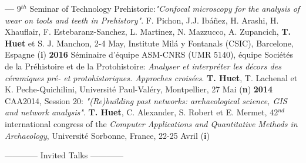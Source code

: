 \documentclass{article}
\newcommand{\fr}[1]{} %
\newcommand{\en}[1]{#1}   %
\begin{document}
\smallbreak
\textbf{--- }9${}^{th}$ Seminar of Technology Prehistoric:\textit{"Confocal microscopy for the analysis of wear on tools and teeth in Prehistory"}. F. Pichon, J.J. Ibáñez, H. Arashi, H. Xhauflair, F. Estebaranz-Sanchez, L. Martinez, N. Mazzucco, A. Zupancich, \textbf{T. Huet} et S. J. Manchon, 2-4 May, Institute Milá y Fontanals (CSIC), Barcelone, Espagne (\textbf{i})
\smallbreak
\textbf{2016 }S\'{e}minaire d'\'{e}quipe ASM-CNRS (UMR 5140), \'{e}quipe Soci\'{e}t\'{e}s de la Pr\'{e}histoire et de la Protohistoire: \textit{Analyser et interpr\'{e}ter les d\'{e}cors des c\'{e}ramiques pr\'{e}- et protohistoriques. Approches crois\'{e}es}. \textbf{T. Huet}, T. Lachenal et K. Peche-Quichilini, Universit\'{e} Paul-Val\'{e}ry, Montpellier, 27 Mai (\textbf{n})
\smallbreak
\textbf{2014 }CAA2014, Session 20: \textit{"(Re)building past networks: archaeological science, GIS and network analysis"}. \textbf{T. Huet}, C. Alexander, S. Robert et E. Mermet, 42${}^{nd}$ international congress of the \textit{Computer Applications and Quantitative Methods in Archaeology}, Universit\'{e} Sorbonne, France, 22-25 Avril (\textbf{i})
\bigbreak

\begin{center}
\fr{------------ Communications (invitées) ------------}
\en{------------ Invited Talks ------------}
\end{center}
\smallbreak
	
\end{document}
